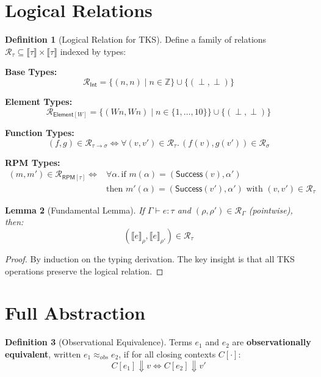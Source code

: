 \documentclass[11pt,twoside,openright]{book}
\theoremstyle{definition}
\newtheorem{definition}{Definition}[chapter]
\theoremstyle{plain}
\newtheorem{lemma}[definition]{Lemma}
\theoremstyle{remark}
\newcommand{\sem}[1]{\llbracket #1 \rrbracket}
\newcommand{\types}{\vdash}
\newcommand{\bigstep}{\Downarrow}
\newcommand{\bot}{\perp}                   %
\begin{document}
\section{Logical Relations}

\begin{definition}[Logical Relation for TKS]
\label{def:logical-rel}
Define a family of relations $\mathcal{R}_\tau \subseteq \sem{\tau} \times \sem{\tau}$ indexed by types:

\textbf{Base Types:}
\[
\mathcal{R}_{\mathsf{Int}} = \{(n, n) \mid n \in \mathbb{Z}\} \cup \{(\bot, \bot)\}
\]

\textbf{Element Types:}
\[
\mathcal{R}_{\mathsf{Element}[W]} = \{(Wn, Wn) \mid n \in \{1,\ldots,10\}\} \cup \{(\bot, \bot)\}
\]

\textbf{Function Types:}
\[
(f, g) \in \mathcal{R}_{\tau \to \sigma} \iff \forall (v, v') \in \mathcal{R}_\tau.\, (f(v), g(v')) \in \mathcal{R}_\sigma
\]

\textbf{RPM Types:}
\begin{align}
(m, m') \in \mathcal{R}_{\mathsf{RPM}[\tau]} \iff &\forall \alpha.\, \text{if } m(\alpha) = (\mathsf{Success}(v), \alpha') \\
&\text{then } m'(\alpha) = (\mathsf{Success}(v'), \alpha') \text{ with } (v, v') \in \mathcal{R}_\tau
\end{align}
\end{definition}

\begin{lemma}[Fundamental Lemma]
\label{lem:fundamental}
If $\Gamma \types e : \tau$ and $(\rho, \rho') \in \mathcal{R}_\Gamma$ (pointwise), then:
\[
(\sem{e}_\rho, \sem{e}_{\rho'}) \in \mathcal{R}_\tau
\]
\end{lemma}

\begin{proof}
By induction on the typing derivation. The key insight is that all TKS operations preserve the logical relation.
\end{proof}

\section{Full Abstraction}

\begin{definition}[Observational Equivalence]
\label{def:obs-equiv}
Terms $e_1$ and $e_2$ are \textbf{observationally equivalent}, written $e_1 \approx_{obs} e_2$, if for all closing contexts $C[\cdot]$:
\[
C[e_1] \bigstep v \iff C[e_2] \bigstep v'
\]
\end{definition}
\end{document}
